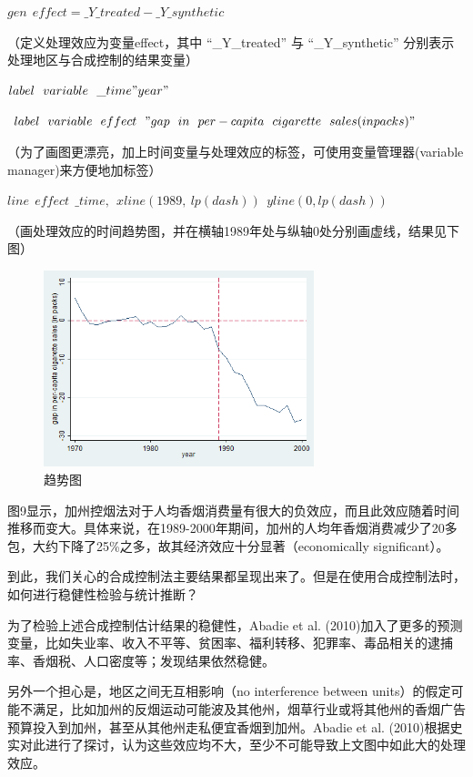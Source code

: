 \documentclass[cn,10pt,math=newtx,citestyle=gb7714-2015,bibstyle=gb7714-2015]{elegantbook}
\begin{document}
	\textbf{$gen~~effect= \_Y\_treated - \_Y\_synthetic$}
	
	（定义处理效应为变量effect，其中 “\_Y\_treated” 与 “\_Y\_synthetic” 分别表示处理地区与合成控制的结果变量）
	
	\textbf{$label~~variable~~\_time "year"$}
	
	\textbf{$label~~variable~~effect~~"gap~~in~~per-capita~~cigarette~~sales (in packs)"$}
	
	（为了画图更漂亮，加上时间变量与处理效应的标签，可使用变量管理器(variable manager)来方便地加标签）
	
	\textbf{$line~~effect~~\_time,~~xline(1989,~lp(dash))~~yline(0,lp(dash))$}
	
	（画处理效应的时间趋势图，并在横轴1989年处与纵轴0处分别画虚线，结果见下图）
	\begin{figure}[htbp]
		\centering
		\includegraphics[width=0.7\textwidth]{line2.png}
		\caption{趋势图}\label{fig:digit}
	\end{figure}
	
	图9显示，加州控烟法对于人均香烟消费量有很大的负效应，而且此效应随着时间推移而变大。具体来说，在1989-2000年期间，加州的人均年香烟消费减少了20多包，大约下降了25\%之多，故其经济效应十分显著（economically significant）。
	
	到此，我们关心的合成控制法主要结果都呈现出来了。但是在使用合成控制法时，如何进行稳健性检验与统计推断？
	
	为了检验上述合成控制估计结果的稳健性，Abadie et al. (2010)加入了更多的预测变量，比如失业率、收入不平等、贫困率、福利转移、犯罪率、毒品相关的逮捕率、香烟税、人口密度等；发现结果依然稳健。
	
	另外一个担心是，地区之间无互相影响（no interference between units）的假定可能不满足，比如加州的反烟运动可能波及其他州，烟草行业或将其他州的香烟广告预算投入到加州，甚至从其他州走私便宜香烟到加州。Abadie et al. (2010)根据史实对此进行了探讨，认为这些效应均不大，至少不可能导致上文图中如此大的处理效应。
	
\end{document}
